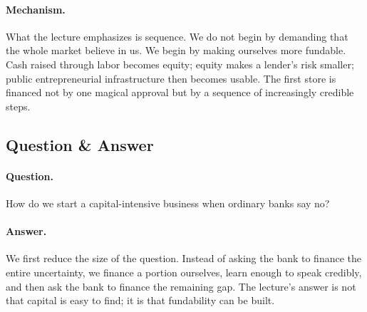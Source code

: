 \begin{figure}[h]
\centering
{}
\end{figure}

\paragraph{Mechanism.}
What the lecture emphasizes is sequence. We do not begin by demanding that the whole market believe in us. We begin by making ourselves more fundable. Cash raised through labor becomes equity; equity makes a lender's risk smaller; public entrepreneurial infrastructure then becomes usable. The first store is financed not by one magical approval but by a sequence of increasingly credible steps.

\subsection{Question \& Answer}

\paragraph{Question.}
How do we start a capital-intensive business when ordinary banks say no?

\paragraph{Answer.}
We first reduce the size of the question. Instead of asking the bank to finance the entire uncertainty, we finance a portion ourselves, learn enough to speak credibly, and then ask the bank to finance the remaining gap. The lecture's answer is not that capital is easy to find; it is that fundability can be built.


